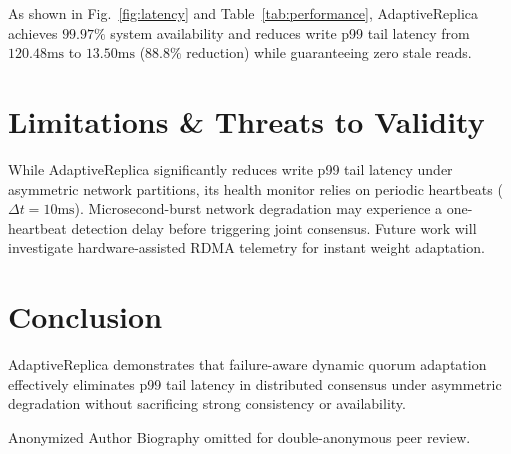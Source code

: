 \documentclass[journal]{IEEEtai}
\begin{document}
As shown in Fig.~\ref{fig:latency} and Table~\ref{tab:performance}, AdaptiveReplica achieves $99.97\%$ system availability and reduces write p99 tail latency from $120.48\text{ms}$ to $13.50\text{ms}$ ($88.8\%$ reduction) while guaranteeing zero stale reads.

\section{Limitations \& Threats to Validity}
While AdaptiveReplica significantly reduces write p99 tail latency under asymmetric network partitions, its health monitor relies on periodic heartbeats ($\Delta t = 10\text{ms}$). Microsecond-burst network degradation may experience a one-heartbeat detection delay before triggering joint consensus. Future work will investigate hardware-assisted RDMA telemetry for instant weight adaptation.

\section{Conclusion}
AdaptiveReplica demonstrates that failure-aware dynamic quorum adaptation effectively eliminates p99 tail latency in distributed consensus under asymmetric degradation without sacrificing strong consistency or availability.




\begin{IEEEbiographynophoto}{Anonymized Author}
Biography omitted for double-anonymous peer review.
\end{IEEEbiographynophoto}
\end{document}
